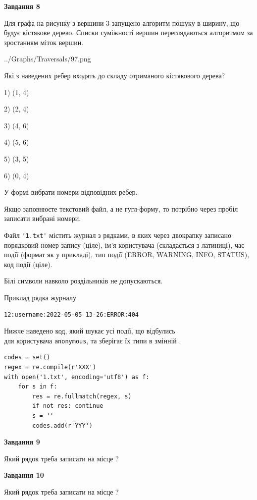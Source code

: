 \documentclass[12pt, ukrainian]{article}
\def\code#1{\Verb!#1!}
\begin{document}
{\begin {large}
{\begin {center}\textbf{Завдання 8}\end {center}}\par
Для графа на рисунку з вершини 3 запущено алгоритм пошуку в ширину, що будує кістякове дерево. Списки суміжності вершин переглядаються алгоритмом за зростанням міток вершин.\par
\begin{center}
	{../Graphs/Traversals/97.png}
\end{center}
\par Які з наведених ребер входять до складу отриманого кістякового дерева?\par
1) (1, 4)\par
2) (2, 4)\par
3) (4, 6)\par
4) (5, 6)\par
5) (3, 5)\par
6) (0, 4)\par
{\vskip 15pt} У формі вибрати номери відповідних ребер.


Якщо заповнюєте текстовий файл, а не гугл-форму, то потрібно через пробіл записа\-ти вибрані номери.\par
\newpage


Файл \code{'1.txt'} містить журнал з рядками, в яких через двокрапку записано поряд\-ко\-вий номер запису (ціле), ім'я користувача (складається з латиниці), час події (фор\-мат як у прикладі), тип події (ERROR, WARNING, INFO, STATUS), код події (ціле).

Білі символи навколо роздільників не допускаються.

Приклад рядка журналу



\begin{verbatim}
12:username:2022-05-05 13-26:ERROR:404
\end{verbatim}


Нижче наведено код, який шукає усі події, що відбулись\\ для користувача \code{anonymous}, та зберігає їх типи в змінній .



\begin{verbatim}
codes = set()
regex = re.compile(r'XXX')
with open('1.txt', encoding='utf8') as f:
    for s in f:
        res = re.fullmatch(regex, s)
        if not res: continue
        s = ''
        codes.add(r'YYY')
\end{verbatim}


{\begin {center}\textbf{Завдання 9}\end {center}}\par
Який рядок треба записати на місце  ?\par
\vspace{5mm}


{\begin {center}\textbf{Завдання 10}\end {center}}\par
Який рядок треба записати на місце  ?\par


\newpage


\end {large}}
\end{document}
